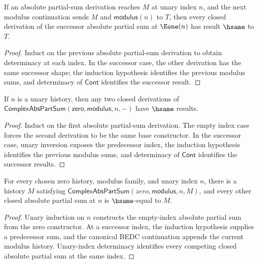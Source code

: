 \begin{lemma}
\label{lem:complex-abs-part-sum-successor-result-deterministic}
If an absolute partial-sum derivation reaches $M$ at unary index $n$, and the
next modulus continuation sends $M$ and $\mathsf{modulus}(n)$ to $T$, then every
closed derivation of the successor absolute partial sum at $\Eone(n)$ has result
$\hsame$ to $T$.
\end{lemma}
\begin{proof}
Induct on the previous absolute partial-sum derivation to obtain determinacy at
each index. In the successor case, the other derivation has the same successor
shape; the induction hypothesis identifies the previous modulus sums, and
determinacy of $\mathsf{Cont}$ identifies the successor result.
\end{proof}

\begin{lemma}
\label{lem:complex-abs-part-sum-unary-index-deterministic}
If $n$ is a unary history, then any two closed derivations of
$\mathsf{ComplexAbsPartSum}(\mathsf{zero},\mathsf{modulus},n,-)$ have
$\hsame$ results.
\end{lemma}
\begin{proof}
Induct on the first absolute partial-sum derivation. The empty index case
forces the second derivation to be the same base constructor. In the successor
case, unary inversion exposes the predecessor index, the induction hypothesis
identifies the previous modulus sums, and determinacy of $\mathsf{Cont}$
identifies the successor results.
\end{proof}

\begin{lemma}
\label{lem:complex-abs-part-sum-exists-unique}
For every chosen zero history, modulus family, and unary index \(n\), there is
a history \(M\) satisfying \(\mathsf{ComplexAbsPartSum}(zero,\mathsf{modulus},n,M)\),
and every other closed absolute partial sum at \(n\) is \(\hsame\)-equal to
\(M\).
\end{lemma}
\begin{proof}
Unary induction on \(n\) constructs the empty-index absolute partial sum from
the zero constructor. At a successor index, the induction hypothesis supplies a
predecessor sum, and the canonical BEDC continuation appends the current
modulus history. Unary-index determinacy identifies every competing closed
absolute partial sum at the same index.
\end{proof}

